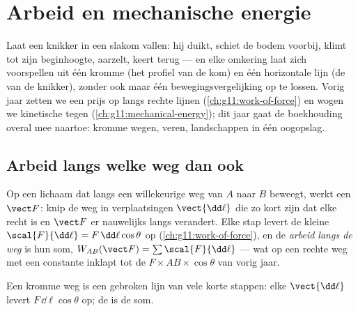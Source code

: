 \chapter{Arbeid en mechanische energie}\label{ch:g12:work-and-energy}

Laat een knikker in een slakom vallen: hij duikt, schiet de bodem voorbij,
klimt tot zijn beginhoogte, aarzelt, keert terug --- en elke omkering laat
zich voorspellen uit één kromme (het profiel van de kom) en één horizontale
lijn (de  van de knikker), zonder ook maar één
bewegingsvergelijking op te lossen. Vorig jaar zetten we een prijs op
 langs rechte lijnen (\cref{ch:g11:work-of-force}) en wogen we
kinetische tegen  (\cref{ch:g11:mechanical-energy}); dit
jaar gaat de boekhouding overal mee naartoe: kromme wegen, veren, landschappen
in één oogopslag.

\section{Arbeid langs welke weg dan ook}

\begin{definition}\label{def:g12:work-and-energy:path}
Op een lichaam dat langs een willekeurige weg van $A$ naar $B$ beweegt, werkt een
 $\vect F$: knip de weg in verplaatsingen $\vect{\dd\ell}$ die
zo kort zijn dat elke recht is en $\vect F$ er nauwelijks langs verandert.
Elke stap levert de kleine  $\scal{F}{\dd\ell} = F\,\dd\ell\cos\theta$
op (\cref{ch:g11:work-of-force}), en de \emph{arbeid langs de
weg} is hun som,
$W_{AB}(\vect F) = \sum \scal{F}{\dd\ell}$ --- wat op een rechte weg met een
constante  inklapt tot de $F \times AB \times \cos\theta$ van vorig
jaar.
\end{definition}

\begin{omfigure}

{\small Een kromme weg is een gebroken lijn van vele korte stappen: elke
$\vect{\dd\ell}$ levert $F\,\dd\ell\cos\theta$ op; de  is de som.}
\end{omfigure}

